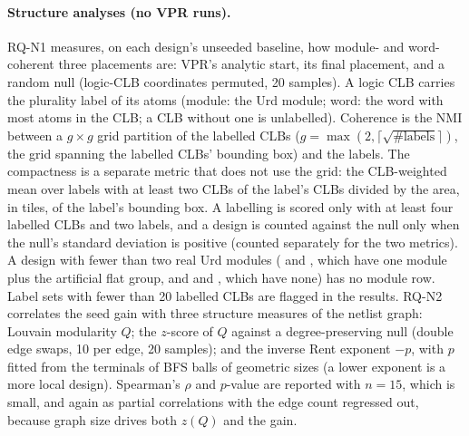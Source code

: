 \paragraph{Structure analyses (no VPR runs).}
RQ-N1 measures, on each design's unseeded baseline, how module- and word-coherent three
placements are: VPR's analytic start, its final placement, and a random null (logic-CLB
coordinates permuted, 20 samples). A logic CLB carries the plurality label of its atoms (module: the Urd module; word:
the word with most atoms in the CLB; a CLB without one is unlabelled). Coherence is the NMI between a $g\times g$ grid partition
of the labelled CLBs ($g=\max(2,\lceil\sqrt{\#\text{labels}}\rceil)$, the grid spanning the labelled CLBs' bounding box) and the labels. The compactness is a
separate metric that does not use the grid: the CLB-weighted mean over labels with at least two CLBs of the label's CLBs divided
by the area, in tiles, of the label's bounding box. A labelling is scored only with at least four labelled CLBs and two labels, and a design
is counted against the null only when the null's standard deviation is positive (counted separately for the two metrics). A design with
fewer than two real Urd modules ( and , which have one module plus the artificial flat group, and  and , which have none)
has no module row. Label sets with fewer than 20 labelled CLBs are flagged in the results. RQ-N2 correlates the seed
gain with three structure measures of the netlist graph: Louvain modularity $Q$; the $z$-score of
$Q$ against a degree-preserving null (double edge swaps, 10 per edge, 20 samples); and the inverse Rent
exponent $-p$, with $p$ fitted from the terminals of BFS balls of geometric sizes (a lower
exponent is a more local design). Spearman's $\rho$ and $p$-value are reported with $n=15$,
which is small, and again as partial correlations with the edge count regressed out, because graph size drives both $z(Q)$ and the gain.

